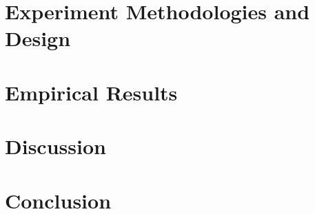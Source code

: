 \documentclass[bsc,frontabs,twoside,singlespacing,parskip,deptreport]{infthesis}     %
\begin{document}
\chapter{Experiment Methodologies and Design}




\chapter{Empirical Results}
\label{chap:results}



\chapter{Discussion}




\chapter{Conclusion}



\end{document}
